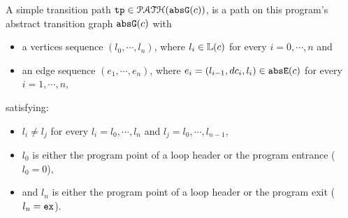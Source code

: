   \begin{defn}
  A simple transition path
  $\mathtt{tp} \in \mathcal{PATH}(\mathtt{abs}{\mathtt{G}}(c))$, is a path on this program's abstract transition graph $\mathtt{abs}{\mathtt{G}}(c)$ with 
  \begin{itemize}
  \item a vertices sequence $(l_0, \cdots, l_n)$, where $l_i \in \mathbb{L}(c)$ for every $i = 0, \cdots, n$ and
  \item an edge sequence $(e_1, \cdots, e_n)$, where $e_i = (l_{i - 1}, dc_i, l_{i}) \in \mathtt{abs}{\mathtt{E}}(c)$ for every $i = 1, \cdots, n$,
  \end{itemize}
  satisfying:
  \begin{itemize}
    \item $l_i \neq l_j$ for every $l_i = l_0, \cdots, l_n$ and $l_j = l_0, \cdots, l_{n - 1}$,
    \item $l_0$ is either the program point of a loop header or the program entrance ($l_0 = 0$),
    \item and $l_n$ is either the program point of a loop header or the program exit ($l_n = \mathtt{ex}$).
  \end{itemize}
  \end{defn}


